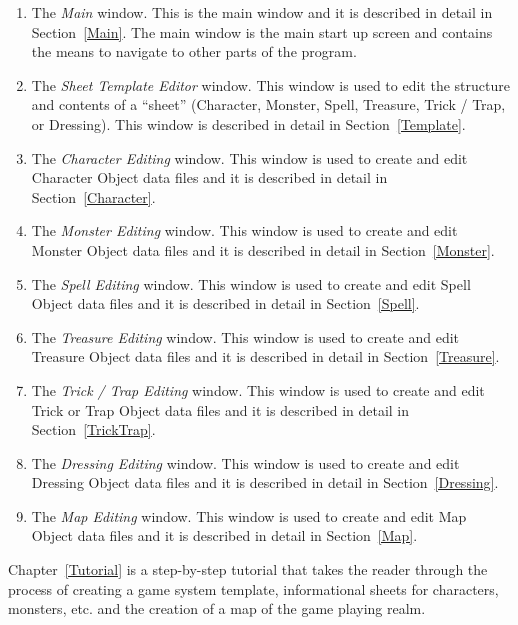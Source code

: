 \begin{enumerate}

\item The {\em Main} window.  This is the main window and it is
described in detail in Section~\ref{Main}.  The main window is the main
start up screen and contains the means to navigate to other parts of the
program.

\item The {\em Sheet Template Editor} window.  This window is used to
edit the structure and contents of a ``sheet'' (Character, Monster,
Spell, Treasure, Trick / Trap, or Dressing).  This window is described
in detail in Section~\ref{Template}.

\item The {\em Character Editing} window.  This window is used to create
and edit Character Object data files and it is described in detail in
Section~\ref{Character}. 

\item The {\em Monster Editing} window.  This window is used to create
and edit Monster Object data files and it is described in detail in
Section~\ref{Monster}. 

\item The {\em Spell Editing} window.  This window is used to create
and edit Spell Object data files and it is described in detail in
Section~\ref{Spell}. 

\item The {\em Treasure Editing} window.  This window is used to create
and edit Treasure Object data files and it is described in detail in
Section~\ref{Treasure}. 

\item The {\em Trick / Trap Editing} window.  This window is used to create
and edit Trick or Trap Object data files and it is described in detail in
Section~\ref{TrickTrap}. 

\item The {\em Dressing Editing} window.  This window is used to create
and edit Dressing Object data files and it is described in detail in
Section~\ref{Dressing}. 

\item The {\em Map Editing} window.  This window is used to create
and edit Map Object data files and it is described in detail in
Section~\ref{Map}. 

\end{enumerate}


Chapter~\ref{Tutorial} is a step-by-step tutorial that takes the reader
through the process of creating a game system template, informational
sheets for characters, monsters, etc. and the creation of a map of the
game playing realm.
